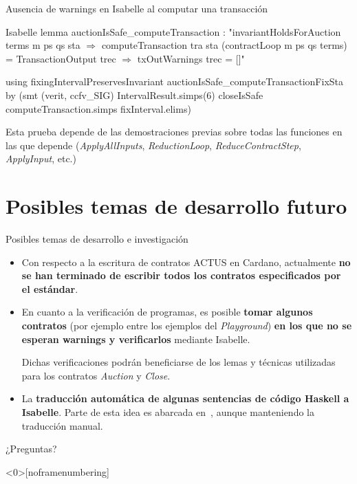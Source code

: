 \documentclass{beamer}
\newcommand{\nologo}{\setbeamertemplate{logo}{}} %
\begin{document}
{\nologo
\begin{frame}[fragile]{Ausencia de warnings en Isabelle al computar una transacción}
\begin{code}{Isabelle}
lemma auctionIsSafe_computeTransaction :
    "invariantHoldsForAuction terms m ps qs sta $\Longrightarrow$
     computeTransaction tra sta (contractLoop m ps qs terms) =
       TransactionOutput trec $\Longrightarrow$ txOutWarnings trec = []"

  using fixingIntervalPreservesInvariant auctionIsSafe_computeTransactionFixSta
  by (smt (verit, ccfv_SIG) IntervalResult.simps(6) closeIsSafe computeTransaction.simps fixInterval.elims)
\end{code}

\vfill

Esta prueba depende de las demostraciones previas sobre todas las funciones en las que depende (\textit{ApplyAllInputs}, \textit{ReductionLoop}, \textit{ReduceContractStep}, \textit{ApplyInput}, etc.)

\end{frame}
}

\section{Posibles temas de desarrollo futuro}

{\nologo
\begin{frame}{Posibles temas de desarrollo e investigación}
    \begin{itemize}
        \item Con respecto a la escritura de contratos ACTUS en Cardano, actualmente \textbf{no se han terminado de escribir todos los contratos especificados por el estándar}.

            \pause
            \vfill

        \item En cuanto a la verificación de programas, es posible \textbf{tomar algunos contratos} (por ejemplo entre los ejemplos del \textit{Playground}) \textbf{en los que no se esperan warnings y verificarlos} mediante Isabelle. 

            \medskip
            
            Dichas verificaciones podrán beneficiarse de los lemas y técnicas utilizadas para los contratos \textit{Auction} y \textit{Close}.

            \pause
            \vfill

        \item La \textbf{traducción automática de algunas sentencias de código Haskell a Isabelle}. Parte de esta idea es abarcada en~\cite{translating-haskell-to-isabelle}, aunque manteniendo la traducción manual.
    \end{itemize}
\end{frame}
}

\begin{frame}
\begin{center}
    \Huge ¿Preguntas?
\end{center}
\end{frame}

\begin{frame}<0>[noframenumbering]
    
    
\end{frame}
\end{document}
